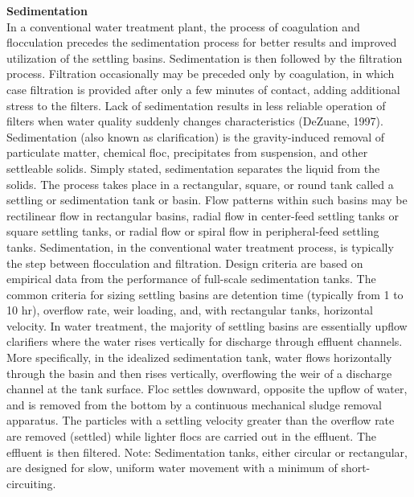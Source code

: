 \documentclass{article}
\begin{document}
\textbf{Sedimentation}\\
In a conventional water treatment plant, the process of coagulation and flocculation precedes the sedimentation process for better results and improved utilization of the settling basins. Sedimentation is then followed by the filtration process. Filtration occasionally may be preceded only by coagulation, in which case filtration is provided after only a few minutes of contact, adding additional stress to the filters. Lack of sedimentation results in less reliable operation of filters when water quality suddenly changes characteristics (DeZuane, 1997).
Sedimentation (also known as clarification) is the gravity-induced removal of particulate matter, chemical floc, precipitates from suspension, and other settleable solids. Simply stated, sedimentation separates the liquid from the solids. The process takes place in a rectangular, square, or round tank called a settling or sedimentation tank or basin. Flow patterns within such basins may be rectilinear flow in rectangular basins, radial flow in center-feed settling tanks or square settling tanks, or radial flow or spiral flow in peripheral-feed settling tanks.
Sedimentation, in the conventional water treatment process, is typically the step between flocculation and filtration. Design criteria are based on empirical data from the performance of full-scale sedimentation tanks. The common criteria for sizing settling basins are detention time (typically from 1 to 10 hr), overflow rate, weir loading, and, with rectangular tanks, horizontal velocity.
In water treatment, the majority of settling basins are essentially upflow clarifiers where the water rises vertically for discharge through effluent channels. More specifically, in the idealized sedimentation tank, water flows horizontally through the basin and then rises vertically, overflowing the weir of a discharge channel at the tank
surface. Floc settles downward, opposite the upflow of water, and is removed from the bottom by a continuous mechanical sludge removal apparatus. The particles with a settling velocity greater than the overflow rate are removed (settled) while lighter flocs are carried out in the effluent. The effluent is then filtered.
Note: Sedimentation tanks, either circular or rectangular, are designed for slow, uniform water movement with a minimum of short-circuiting.\\
\end{document}
